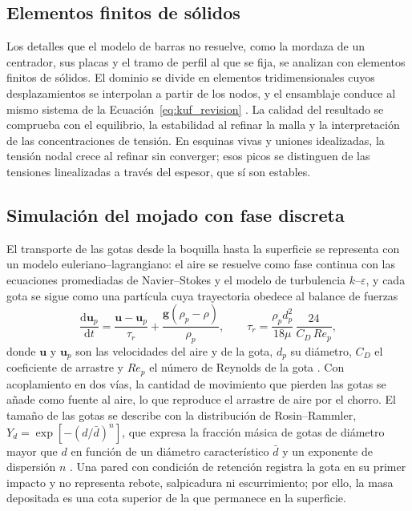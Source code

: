 \subsection{Elementos finitos de sólidos}
\label{sec:teo-fem}

Los detalles que el modelo de barras no resuelve, como la mordaza de un centrador, sus placas y el tramo de perfil al que se fija, se analizan con elementos finitos de sólidos. El dominio se divide en elementos tridimensionales cuyos desplazamientos se interpolan a partir de los nodos, y el ensamblaje conduce al mismo sistema de la Ecuación~\eqref{eq:kuf_revision} \cite{shigley2015}. La calidad del resultado se comprueba con el equilibrio, la estabilidad al refinar la malla y la interpretación de las concentraciones de tensión. En esquinas vivas y uniones idealizadas, la tensión nodal crece al refinar sin converger; esos picos se distinguen de las tensiones linealizadas a través del espesor, que sí son estables.

\subsection{Simulación del mojado con fase discreta}
\label{sec:teo-cfd}

El transporte de las gotas desde la boquilla hasta la superficie se representa con un modelo euleriano--lagrangiano: el aire se resuelve como fase continua con las ecuaciones promediadas de Navier--Stokes y el modelo de turbulencia $k$--$\varepsilon$, y cada gota se sigue como una partícula cuya trayectoria obedece al balance de fuerzas
\begin{equation}
  \frac{\mathrm{d}\mathbf{u}_p}{\mathrm{d}t}=\frac{\mathbf{u}-\mathbf{u}_p}{\tau_r}
  +\frac{\mathbf{g}(\rho_p-\rho)}{\rho_p},\qquad
  \tau_r=\frac{\rho_pd_p^2}{18\mu}\,\frac{24}{C_D\,Re_p},
  \label{eq:teo-dpm}
\end{equation}
donde $\mathbf{u}$ y $\mathbf{u}_p$ son las velocidades del aire y de la gota, $d_p$ su diámetro, $C_D$ el coeficiente de arrastre y $Re_p$ el número de Reynolds de la gota \cite{fluent2026}. Con acoplamiento en dos vías, la cantidad de movimiento que pierden las gotas se añade como fuente al aire, lo que reproduce el arrastre de aire por el chorro. El tamaño de las gotas se describe con la distribución de Rosin--Rammler, $Y_d=\exp[-(d/\bar d)^n]$, que expresa la fracción másica de gotas de diámetro mayor que $d$ en función de un diámetro característico $\bar d$ y un exponente de dispersión $n$ \cite{fluent2026}. Una pared con condición de retención registra la gota en su primer impacto y no representa rebote, salpicadura ni escurrimiento; por ello, la masa depositada es una cota superior de la que permanece en la superficie.

